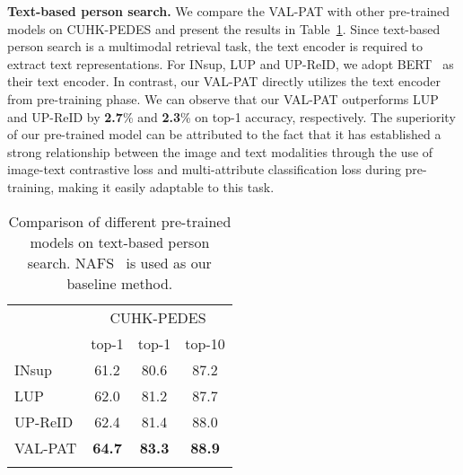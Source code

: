 \documentclass[final]{cvpr}
\begin{document}
\noindent
\textbf{Text-based person search.}
We compare the VAL-PAT with other pre-trained models on CUHK-PEDES and present the results in Table~\ref{tab:tps}.
Since text-based person search is a multimodal retrieval task, the text encoder is required to extract text representations.
For INsup, LUP and UP-ReID, we adopt BERT~\cite{devlin2018bert} as their text encoder.
In contrast, our VAL-PAT directly utilizes the text encoder from pre-training phase.
We can observe that our VAL-PAT outperforms LUP and UP-ReID by \textbf{2.7}\% and \textbf{2.3}\% on top-1 accuracy, respectively.
The superiority of our pre-trained model can be attributed to the fact that it has established a strong relationship between the image and text modalities through the use of image-text contrastive loss and multi-attribute classification loss during pre-training, making it easily adaptable to this task.
\begin{table}[h!]
\vspace{-1mm}
\small
    \centering
    \setlength{\tabcolsep}{4.5mm}
        \begin{tabular}{l|ccc}
        \shline
        \centering
        \multirow{2}{*}{pre-train} & \multicolumn{3}{c}{CUHK-PEDES}  \\
        \cline{2-4} & top-1 & top-1 & top-10  \\
        \hline
        \centering
        INsup   & 61.2 & 80.6 & 87.2\\
        \centering
\centering
        LUP  &  62.0 & 81.2 &  87.7\\
        \centering
        UP-ReID  & 62.4 &  81.4 & 88.0\\
        \centering
        VAL-PAT & \textbf{64.7} & \textbf{83.3} & \textbf{88.9}\\
        \shline
        \end{tabular}
        \vspace{-1mm}
        \caption{Comparison of different pre-trained models on text-based person search.
        NAFS~\cite{gao2021contextual} is used as our baseline method.}
        \vspace{-5mm}
        \label{tab:tps}
\end{table}
\end{document}
